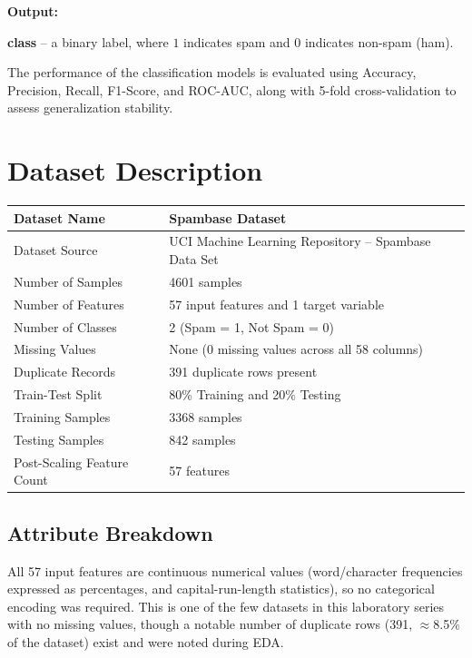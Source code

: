 \documentclass[12pt,a4paper]{article}
\begin{document}
\textbf{Output:}

\begin{center}
\textbf{class} -- a binary label, where $1$ indicates spam and $0$ indicates non-spam (ham).
\end{center}

The performance of the classification models is evaluated using Accuracy, Precision, Recall, F1-Score, and ROC-AUC, along with 5-fold cross-validation to assess generalization stability.

\section{Dataset Description}

\begin{longtable}{|p{6cm}|p{8cm}|}
\hline
Dataset Name & Spambase Dataset \\ \hline
Dataset Source & UCI Machine Learning Repository -- Spambase Data Set \\ \hline
Number of Samples & 4601 samples \\ \hline
Number of Features & 57 input features and 1 target variable \\ \hline
Number of Classes & 2 (Spam = 1, Not Spam = 0) \\ \hline
Missing Values & None (0 missing values across all 58 columns) \\ \hline
Duplicate Records & 391 duplicate rows present \\ \hline
Train-Test Split & 80\% Training and 20\% Testing \\ \hline
Training Samples & 3368 samples \\ \hline
Testing Samples & 842 samples \\ \hline
Post-Scaling Feature Count & 57 features \\ \hline
\end{longtable}

\subsection*{Attribute Breakdown}

All 57 input features are continuous numerical values (word/character frequencies expressed as percentages, and capital-run-length statistics), so no categorical encoding was required. This is one of the few datasets in this laboratory series with no missing values, though a notable number of duplicate rows (391, $\approx$8.5\% of the dataset) exist and were noted during EDA.
\end{document}
